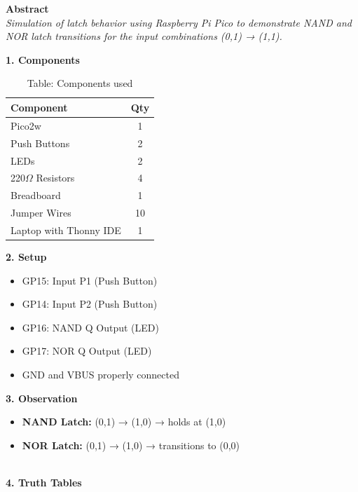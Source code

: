 \documentclass[12pt]{article}
\begin{document}
\begin{multicols}{2}

\noindent\textbf{Abstract} \\[0.5em]
\textit{Simulation of latch behavior using Raspberry Pi Pico to demonstrate NAND and NOR latch transitions for the input combinations (0,1) → (1,1).}

\vspace{1em}
\noindent\textbf{1. Components}
\begin{table}[h]
\small
\centering
\begin{tabular}{|p{4.2cm}|c|}
\hline
\textbf{Component} & \textbf{Qty} \\
\hline
 Pico2w & 1 \\
Push Buttons & 2 \\
LEDs & 2 \\
220$\Omega$ Resistors & 4 \\
Breadboard & 1 \\
Jumper Wires & 10 \\
Laptop with Thonny IDE & 1 \\
\hline
\end{tabular}
\caption*{Table: Components used}
\end{table}

\vspace{1em}
\noindent\textbf{2. Setup}
\begin{itemize}
    \item GP15: Input P1 (Push Button)
    \item GP14: Input P2 (Push Button)
    \item GP16: NAND Q Output (LED)
    \item GP17: NOR Q Output (LED)
    \item GND and VBUS properly connected
\end{itemize}

\vspace{1em}
\noindent\textbf{3. Observation}
\begin{itemize}
    \item \textbf{NAND Latch:} (0,1) → (1,0) → holds at (1,0)
    \item \textbf{NOR Latch:} (0,1) → (1,0) → transitions to (0,0)
\end{itemize}

\end{multicols}
\\
\noindent\textbf{4. Truth Tables}\\
\\
\\
\end{document}
